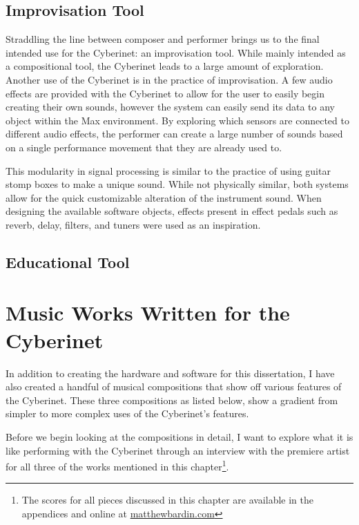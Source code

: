 \section{Improvisation Tool}
Straddling the line between composer and performer brings us to the final intended use for the Cyberinet: an improvisation tool. While mainly intended as a compositional tool, the Cyberinet leads to a large amount of exploration. Another use of the Cyberinet is in the practice of improvisation. A few audio effects are provided with the Cyberinet to allow for the user to easily begin creating their own sounds, however the system can easily send its data to any object within the Max environment. By exploring which sensors are connected to different audio effects, the performer can create a large number of sounds based on a single performance movement that they are already used to.

This modularity in signal processing is similar to the practice of using guitar stomp boxes to make a unique sound. While not physically similar, both systems allow for the quick customizable alteration of the instrument sound. When designing the available software objects, effects present in effect pedals such as reverb, delay, filters, and tuners were used as an inspiration.

\section{Educational Tool}



\chapter{Music Works Written for the Cyberinet}

In addition to creating the hardware and software for this dissertation, I have also created a handful of musical compositions that show off various features of the Cyberinet. These three compositions as listed below, show a gradient from simpler to more complex uses of the Cyberinet’s features.

Before we begin looking at the compositions in detail, I want to explore what it is like performing with the Cyberinet through an interview with the premiere artist for all three of the works mentioned in this chapter\footnote{The scores for all pieces discussed in this chapter are available in the appendices and online at \url{matthewbardin.com}}.





